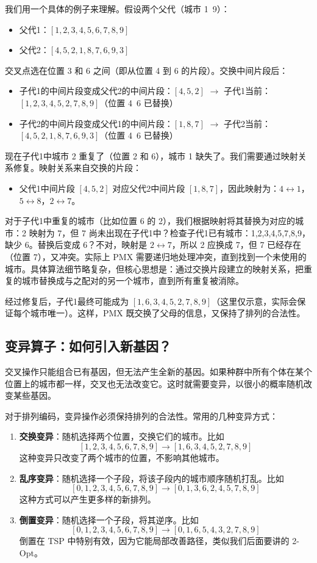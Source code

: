\documentclass[lang=cn,zihao=-4,a4paper,fontset=windows]{beautybook}
\begin{document}
我们用一个具体的例子来理解。假设两个父代（城市 1~9）：
\begin{itemize}
    \item 父代1：$[1, 2, 3, 4, 5, 6, 7, 8, 9]$
    \item 父代2：$[4, 5, 2, 1, 8, 7, 6, 9, 3]$
\end{itemize}

交叉点选在位置 3 和 6 之间（即从位置 4 到 6 的片段）。交换中间片段后：
\begin{itemize}
    \item 子代1的中间片段变成父代2的中间片段：$[4,5,2]$ $\to$ 子代1当前：$[1,2,3,4,5,2,7,8,9]$（位置 4~6 已替换）
    \item 子代2的中间片段变成父代1的中间片段：$[1,8,7]$ $\to$ 子代2当前：$[4,5,2,1,8,7,6,9,3]$（位置 4~6 已替换）
\end{itemize}

现在子代1中城市 2 重复了（位置 2 和 6），城市 1 缺失了。我们需要通过映射关系修复。映射关系来自交换的片段：
\begin{itemize}
    \item 父代1中间片段 $[4,5,2]$ 对应父代2中间片段 $[1,8,7]$，因此映射为：$4 \leftrightarrow 1$，$5 \leftrightarrow 8$，$2 \leftrightarrow 7$。
\end{itemize}

对于子代1中重复的城市（比如位置 6 的 2），我们根据映射将其替换为对应的城市：2 映射为 7，但 7 尚未出现在子代1中？检查子代1已有城市：1,2,3,4,5,7,8,9，缺少 6。替换后变成 6？不对，映射是 $2 \leftrightarrow 7$，所以 2 应换成 7，但 7 已经存在（位置 7），又冲突。实际上 PMX 需要递归地处理冲突，直到找到一个未使用的城市。具体算法细节略复杂，但核心思想是：通过交换片段建立的映射关系，把重复的城市替换成与之配对的另一个城市，直到所有重复被消除。

经过修复后，子代1最终可能成为 $[1, 6, 3, 4, 5, 2, 7, 8, 9]$（这里仅示意，实际会保证每个城市唯一）。这样，PMX 既交换了父母的信息，又保持了排列的合法性。

\subsection{变异算子：如何引入新基因？}

交叉操作只能组合已有基因，但无法产生全新的基因。如果种群中所有个体在某个位置上的城市都一样，交叉也无法改变它。这时就需要变异，以很小的概率随机改变某些基因。

对于排列编码，变异操作必须保持排列的合法性。常用的几种变异方式：

\begin{enumerate}
    \item \textbf{交换变异}：随机选择两个位置，交换它们的城市。比如 \[[1,2,3,4,5,6,7,8,9] \to [1,6,3,4,5,2,7,8,9]\]这种变异只改变了两个城市的位置，不影响其他城市。
    \item \textbf{乱序变异}：随机选择一个子段，将该子段内的城市顺序随机打乱。比如 \[[0,1,2,3,4,5,6,7,8,9] \to [0,1,3,6,2,4,5,7,8,9]\]这种方式可以产生更多样的新排列。
    \item \textbf{倒置变异}：随机选择一个子段，将其逆序。比如 \[[0,1,2,3,4,5,6,7,8,9] \to [0,1,6,5,4,3,2,7,8,9]\]倒置在 TSP 中特别有效，因为它能局部改善路径，类似我们后面要讲的 2-Opt。
\end{enumerate}
\end{document}
